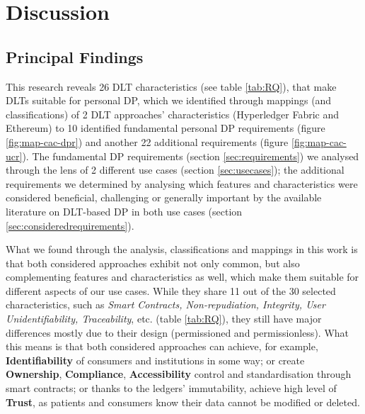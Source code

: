 
\chapter{Discussion}
\label{ch:Discussion}



\section{Principal Findings}
\label{sec:PrincipleFindings}

This research reveals 26 DLT characteristics (see table \ref{tab:RQ}), that make DLTs suitable for personal DP, which we identified through mappings (and classifications) of 2 DLT approaches' characteristics (Hyperledger Fabric and Ethereum) to 10 identified fundamental personal DP requirements (figure \ref{fig:map-cac-dpr}) and another 22 additional requirements (figure \ref{fig:map-cac-ucr}). The fundamental DP requirements (section \ref{sec:requirements}) we analysed through the lens of 2 different use cases (section \ref{sec:usecases}); the additional requirements we determined by analysing which features and characteristics were considered beneficial, challenging or generally important by the available literature on DLT-based DP in both use cases (section \ref{sec:consideredrequirements}). 

What we found through the analysis, classifications and mappings in this work is that both considered approaches exhibit not only common, but also complementing features and characteristics as well, which make them suitable for different aspects of our use cases. While they share 11 out of the 30 selected characteristics, such as \textit{Smart Contracts, Non-repudiation, Integrity, User Unidentifiability, Traceability}, etc. (table \ref{tab:RQ}), they still have major differences mostly due to their design (permissioned and permissionless). What this means is that both considered approaches can achieve, for example, \textbf{Identifiability} of consumers and institutions in some way; or create \textbf{Ownership}, \textbf{Compliance}, \textbf{Accessibility} control and standardisation through smart contracts; or thanks to the ledgers' immutability, achieve high level of \textbf{Trust}, as patients and consumers know their data cannot be modified or deleted. 

